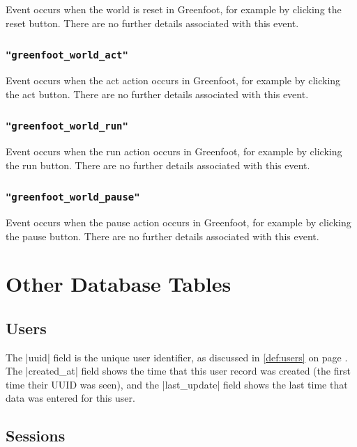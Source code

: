 \documentclass{report}
\newcommand{\myref}[1]{\autoref{#1} on page \pageref*{#1}}
\begin{document}
Event occurs when the world is reset in Greenfoot, for example
by clicking the reset button.
There are no further details associated with this event.

\subsection{\lstinline!"greenfoot_world_act"!}

Event occurs when the act action occurs in Greenfoot, for example
by clicking the act button.
There are no further details associated with this event.

\subsection{\lstinline!"greenfoot_world_run"!}

Event occurs when the run action occurs in Greenfoot, for example
by clicking the run button.
There are no further details associated with this event.

\subsection{\lstinline!"greenfoot_world_pause"!}

Event occurs when the pause action occurs in Greenfoot, for example
by clicking the pause button.
There are no further details associated with this event.

\chapter{Other Database Tables}
\label{sec:other_tables}

\section{Users}


The |uuid| field is the unique user identifier, as discussed in \myref{def:users}.
The |created_at| field shows the time that this user record was
created (the first time their UUID was seen), and the |last_update| field shows the last time that data was entered for
this user.

\section{Sessions}

\end{document}

